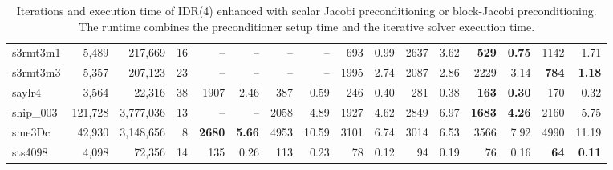 \begin{landscape}
\begin{table}
\begin{tabular}{lrrr||rr|rr|rr|rr|rr|rr}
              s3rmt3m1  &  5,489  &  217,669  &  16  &       --  &       --   
              &       --  &       --   &      693 &     0.99  &     2637 &     
              3.62  & \textbf{     529} & \textbf{    0.75}  &     1142 &     
              1.71\\
              s3rmt3m3  &  5,357  &  207,123  &  23  &       --  &       --   
              &       --  &       --   &     1995 &     2.74  &     2087 &     
              2.86  &     2229 &     3.14  & \textbf{     784} & \textbf{    
              1.18}\\
                saylr4  &  3,564  &  22,316  &  38  &     1907 &     2.46  
                &      387 &     0.59  &      246 &     0.40  &      281 &     
                0.38  & \textbf{     163} & \textbf{    0.30}  &      170 &     
                0.32\\
              ship\_003  &  121,728  &  3,777,036  &  13  &       --  &       
              --   &     2058 &     4.89  &     1927 &     4.62  &     2849 
              &     6.97  & \textbf{    1683} & \textbf{    4.26}  &     2160 
              &     5.75\\
                sme3Dc  &  42,930  &  3,148,656  &  8  & \textbf{    2680} & 
                \textbf{    5.66}  &     4953 &    10.59  &     3101 &     
                6.74  &     3014 &     6.53  &     3566 &     7.92  &     4990 
                &    11.19\\
               sts4098  &  4,098  &  72,356  &  14  &      135 &     0.26  
               &      113 &     0.23  &       78 &     0.12  &       94 &     
               0.19  &       76 &     0.16  & \textbf{      64} & \textbf{    
               0.11}\\
\hline
\hline
\end{tabular}

\caption{Iterations and execution time of IDR(4) enhanced with scalar Jacobi preconditioning or block-Jacobi preconditioning.\newline
The runtime combines the preconditioner setup time and the iterative solver execution time.}
\label{tab:idr4comparison}
\end{table}

\end{landscape}
